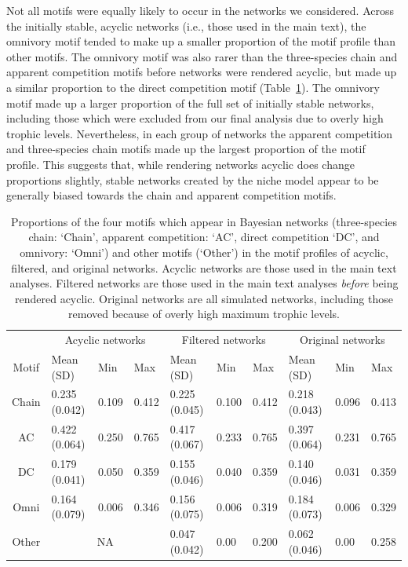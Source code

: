 \documentclass[12pt]{article}
\begin{document}
\begin{spacing}{2.0}
    Not all motifs were equally likely to occur in the networks we considered. 
    Across the initially stable, acyclic networks (i.e., those used in the main text), the omnivory motif tended to make up a smaller proportion of the motif profile than other motifs.
    The omnivory motif was also rarer than the three-species chain and apparent competition motifs before networks were rendered acyclic, but made up a similar proportion to the direct competition motif (Table~\ref{tab:acyclic_proportions}).
    The omnivory motif made up a larger proportion of the full set of initially stable networks, including those which were excluded from our final analysis due to overly high trophic levels.
    Nevertheless, in each group of networks the apparent competition and three-species chain motifs made up the largest proportion of the motif profile.
    This suggests that, while rendering networks acyclic does change proportions slightly, stable networks created by the niche model appear to be generally biased towards the chain and apparent competition motifs.
    
    \begin{table}[h!]
        \centering
        \caption{Proportions of the four motifs which appear in Bayesian networks (three-species chain: `Chain', apparent competition: `AC', direct competition `DC', and omnivory: `Omni') and other motifs (`Other') in the motif profiles of acyclic, filtered, and original networks. Acyclic networks are those used in the main text analyses. Filtered networks are those used in the main text analyses \emph{before} being rendered acyclic. Original networks are all simulated networks, including those removed because of overly high maximum trophic levels.}
        \label{tab:acyclic_proportions}            \footnotesize
        \begin{tabular}{c|l l l | l l l | l l l |}
        & \multicolumn{3}{c|}{Acyclic networks} & \multicolumn{3}{c|}{Filtered networks} & \multicolumn{3}{c|}{Original networks} \\
        Motif & Mean (SD) & Min & Max & Mean (SD) & Min & Max & Mean (SD) & Min & Max \\
        \hline
        Chain & 0.235 (0.042) & 0.109 & 0.412 & 0.225 (0.045) & 0.100 & 0.412 & 0.218 (0.043) & 0.096 & 0.413 \\
        AC & 0.422 (0.064) & 0.250 & 0.765 &
        0.417 (0.067) & 0.233 & 0.765 & 0.397 (0.064) & 0.231 & 0.765 \\
        DC & 0.179 (0.041) & 0.050 & 0.359 & 0.155 (0.046) & 0.040 & 0.359 & 0.140 (0.046) & 0.031 & 0.359 \\
        Omni & 0.164 (0.079) & 0.006 & 0.346 & 0.156 (0.075) & 0.006 & 0.319 & 0.184 (0.073) & 0.006 & 0.329 \\
        \hline
        Other & \multicolumn{3}{c|}{NA} & 0.047 (0.042) & 0.00 & 0.200 &
        0.062 (0.046) & 0.00 & 0.258 \\
        \end{tabular}
    \end{table}




\end{spacing}
\end{document}
